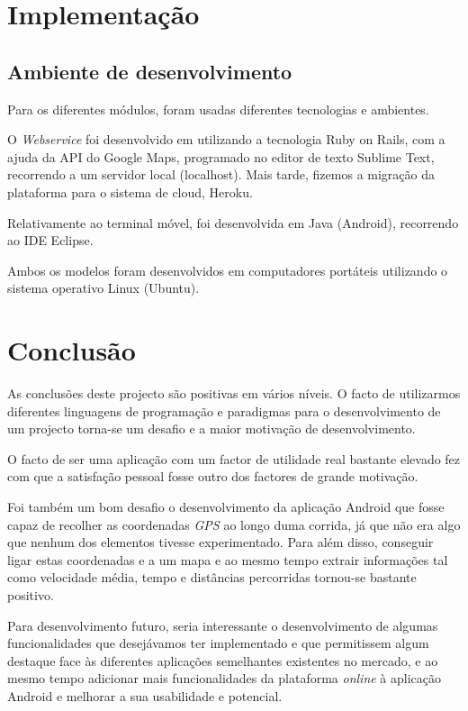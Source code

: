 \documentclass[15pt,a4paper]{article}
\begin{document}
\section{Implementação}

\subsection{Ambiente de desenvolvimento}

Para os diferentes módulos, foram usadas diferentes tecnologias e ambientes.

O \textit{Webservice} foi desenvolvido em utilizando a tecnologia Ruby on Rails, com a ajuda da API do Google Maps, programado no editor de texto Sublime Text, recorrendo a um servidor local (localhost). Mais tarde, fizemos a migração da plataforma para o sistema de cloud, Heroku.

Relativamente ao terminal móvel, foi desenvolvida em Java (Android), recorrendo ao IDE Eclipse. 

Ambos os modelos foram desenvolvidos em computadores portáteis utilizando o sistema operativo Linux (Ubuntu).


\newpage
\section{Conclusão}

As conclusões deste projecto são positivas em vários níveis. O facto de utilizarmos diferentes linguagens de programação e paradigmas para o desenvolvimento de um projecto torna-se um desafio e a maior motivação de desenvolvimento. 

O facto de ser uma aplicação com um factor de utilidade real bastante elevado fez com que a satisfação pessoal fosse outro dos factores de grande motivação.

Foi também um bom desafio o desenvolvimento da aplicação Android que fosse capaz de recolher as coordenadas \textit{GPS} ao longo duma corrida, já que não era algo que nenhum dos elementos tivesse experimentado. Para além disso, conseguir ligar estas coordenadas e a um mapa e ao mesmo tempo extrair informações tal como velocidade média, tempo e distâncias percorridas tornou-se bastante positivo.

Para desenvolvimento futuro, seria interessante o desenvolvimento de algumas funcionalidades que desejávamos ter implementado e que permitissem algum destaque face às diferentes aplicações semelhantes existentes no mercado, e ao mesmo tempo adicionar mais funcionalidades da plataforma \textit{online} à aplicação Android e melhorar a sua usabilidade e potencial.
\end{document}
